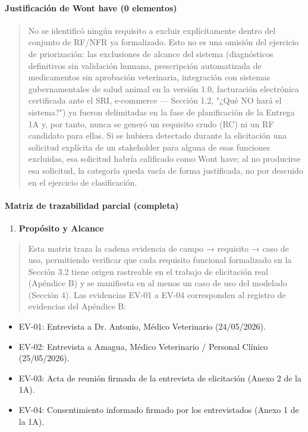 \documentclass[
]{article}
\begin{document}
\paragraph{Justificación de Won\textquotesingle t have (0
elementos)}\label{justificaciuxf3n-de-wont-have-0-elementos}

\begin{quote}
No se identificó ningún requisito a excluir explícitamente dentro del
conjunto de RF/NFR ya formalizado. Esto no es una omisión del ejercicio
de priorización: las exclusiones de alcance del sistema (diagnósticos
definitivos sin validación humana, prescripción automatizada de
medicamentos sin aprobación veterinaria, integración con sistemas
gubernamentales de salud animal en la versión 1.0, facturación
electrónica certificada ante el SRI, e-commerce --- Sección 1.2, "¿Qué
NO hará el sistema?") ya fueron delimitadas en la fase de planificación
de la Entrega 1A y, por tanto, nunca se generó un requisito crudo (RC)
ni un RF candidato para ellas. Si se hubiera detectado durante la
elicitación una solicitud explícita de un stakeholder para alguna de
esas funciones excluidas, esa solicitud habría calificado como
Won\textquotesingle t have; al no producirse esa solicitud, la categoría
queda vacía de forma justificada, no por descuido en el ejercicio de
clasificación.
\end{quote}

\paragraph{Matriz de trazabilidad parcial
(completa)}\label{matriz-de-trazabilidad-parcial-completa}

\begin{enumerate}
\def\labelenumi{\arabic{enumi}.}
\item
  \protect{}\label{_bookmark111}{}\textbf{Propósito y
  Alcance}
\end{enumerate}

\begin{quote}
Esta matriz traza la cadena evidencia de campo → requisito → caso de
uso, permitiendo verificar que cada requisito funcional formalizado en
la Sección 3.2 tiene origen rastreable en el trabajo de elicitación real
(Apéndice B) y se manifiesta en al menos un caso de uso del modelado
(Sección 4). Las evidencias EV-01 a EV-04 corresponden al registro de
evidencias del Apéndice B:
\end{quote}

\begin{itemize}
\item
  EV-01: Entrevista a Dr. Antonio, Médico Veterinario (24/05/2026).
\item
  EV-02: Entrevista a Amagua, Médico Veterinario / Personal Clínico
  (25/05/2026).
\item
  EV-03: Acta de reunión firmada de la entrevista de elicitación (Anexo
  2 de la 1A).
\item
  EV-04: Consentimiento informado firmado por los entrevistados (Anexo 1
  de la 1A).
\end{itemize}
\end{document}
